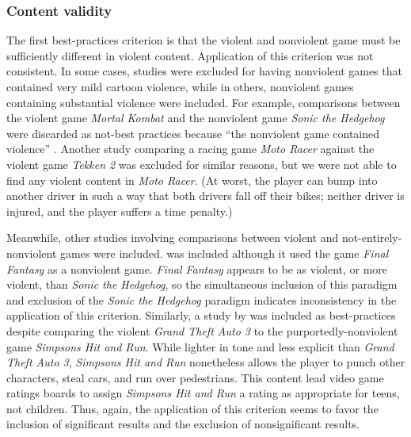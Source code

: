\documentclass[man]{apa6}
\begin{document}
\subsubsection{Content validity}
The first best-practices criterion is that the violent and nonviolent game must be sufficiently different in violent content. Application of this criterion was not consistent. In some cases, studies were excluded for having nonviolent games that contained very mild cartoon violence, while in others, nonviolent games containing substantial violence were included. For example, comparisons between the violent game {\em Mortal Kombat} and the nonviolent game {\em Sonic the Hedgehog} were discarded as not-best practices \citep[e.g.,][]{Cohn:1995; Hoffman:1994} because ``the nonviolent game contained violence'' \citep[supplementary materials]{Anderson:etal:2010}. Another study comparing a racing game {\em Moto Racer} against the violent game {\em Tekken 2} \citep{Brooks:2000} was excluded for similar reasons, but we were not able to find any violent content in {\em Moto Racer}. (At worst, the player can bump into another driver in such a way that both drivers fall off their bikes; neither driver is injured, and the player suffers a time penalty.) 

Meanwhile, other studies involving comparisons between violent and not-entirely-nonviolent games were included. \citet{Konijn:etal:2007} was included although it used the game {\em Final Fantasy} as a nonviolent game. {\em Final Fantasy} appears to be as violent, or more violent, than {\em Sonic the Hedgehog}, so the simultaneous inclusion of this paradigm and exclusion of the {\em Sonic the Hedgehog} paradigm indicates inconsistency in the application of this criterion. Similarly, a study by \citet{Brady:Mathews:2006} was included as best-practices despite comparing the violent {\em Grand Theft Auto 3} to the purportedly-nonviolent game {\em Simpsons Hit and Run}. While lighter in tone and less explicit than {\em Grand Theft Auto 3}, {\em Simpsons Hit and Run} nonetheless allows the player to punch other characters, steal cars, and run over pedestrians. This content lead video game ratings boards to assign {\em Simpsons Hit and Run} a rating as appropriate for teens, not children. Thus, again, the application of this criterion seems to favor the inclusion of significant results and the exclusion of nonsignificant results.
\end{document}
